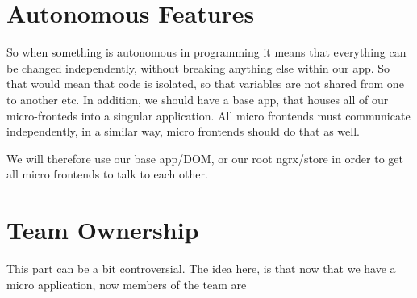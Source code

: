 \section{Autonomous Features}
So when something is autonomous in programming it means that everything can be changed independently, without breaking anything else within our app. So that would mean that code is isolated, so that variables are not shared from one to another etc. In addition, we should have a base app, that houses all of our micro-fronteds into a singular application. All micro frontends must communicate independently, in a similar way, micro frontends should do that as well. 

We will therefore use our base app/DOM, or our root ngrx/store in order to get all micro frontends to talk to each other. 

\section{Team Ownership}
This part can be a bit controversial. The idea here, is that now that we have a micro application, now members of the team are 